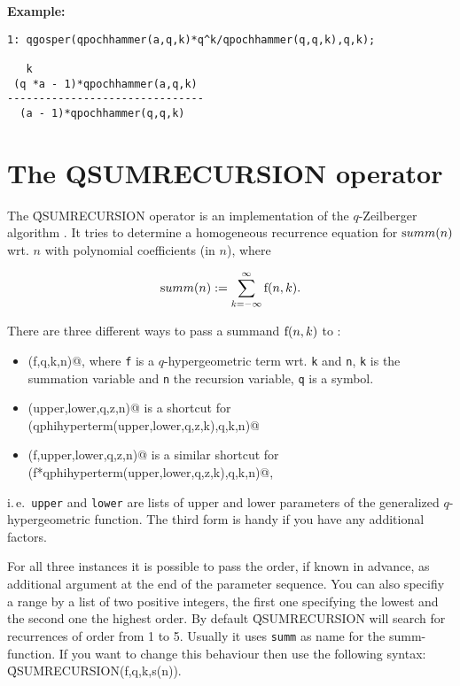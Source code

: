 {\bf Example:}
\begin{verbatim}
1: qgosper(qpochhammer(a,q,k)*q^k/qpochhammer(q,q,k),q,k);

   k
 (q *a - 1)*qpochhammer(a,q,k)
-------------------------------
  (a - 1)*qpochhammer(q,q,k)

\end{verbatim}



\section{The {\ttfamily QSUMRECURSION} operator}
\label{QSUMRECURSION}

The \f{QSUMRECURSION} operator is an implementation 
of the $q$-Zeilberger algorithm \cite{Koornwinder:93}.
It tries to determine a homogeneous recurrence equation for 
${\mathrm summ}(n)$ wrt. $n$ with polynomial coefficients (in $n$), where

\[
	{\mathrm summ}(n):= \sum_{k=-\infty}^{\infty}{{\mathrm f}(n,k)}.
\]

There are three different ways to pass a summand ${\mathrm f}(n,k)$
to {\verb@qsumrecursion@}:

\begin{itemize}
	\item {\verb@qsumrecursion(f,q,k,n)@}, where {\tt f} is a
		$q$-hypergeometric term wrt. {\tt k} and {\tt n},
		{\tt k} is the summation variable and {\tt n} the recursion
		variable, {\tt q} is a symbol.
	\item {\verb@qsumrecursion(upper,lower,q,z,n)@} is a shortcut for \\
		{\verb@qsumrecursion(qphihyperterm(upper,lower,q,z,k),q,k,n)@}
	\item {\verb@qsumrecursion(f,upper,lower,q,z,n)@} is a similar 
		shortcut for\\
		{\verb@qsumrecursion(f*qphihyperterm(upper,lower,q,z,k),q,k,n)@},
\end{itemize}

i.\,e.\ {\tt upper} and {\tt lower} are lists of upper and lower
parameters of the generalized $q$-hypergeometric function.
The third form is handy if you have any additional factors.

For all three instances it is possible to pass the order, if known 
in advance, as additional argument at the end of the parameter sequence.
You can also specifiy a range by a list of two positive integers, the first
one specifying the lowest and the second one the highest order. By default
\f{QSUMRECURSION} will search for recurrences of order from 1 to 5. Usually
it uses {\tt summ} as name for the summ-function. If you want to change this 
behaviour then use the following syntax: \f{QSUMRECURSION(f,q,k,s(n))}.

